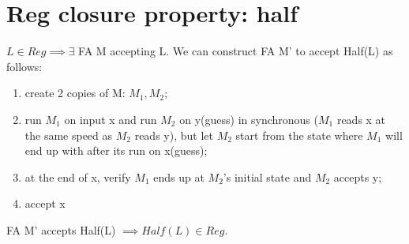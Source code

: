 \documentclass{article}
\begin{document}
\section{Reg closure property: half}
$L \in Reg \implies \exists$ FA M accepting L. We can construct FA M' to accept
Half(L) as follows:
\begin{enumerate}
  \item create 2 copies of M: $M_1, M_2$;
  \item run $M_1$ on input x and run $M_2$ on y(guess) in synchronous ($M_1$
  reads x at the same speed as $M_2$ reads y), but let $M_2$ start from the
  state where $M_1$ will end up with after its run on x(guess);
  \item at the end of x, verify $M_1$ ends up at $M_2$'s initial state and $M_2$
  accepts y;
  \item accept x
\end{enumerate}
FA M' accepts Half(L) $\implies Half(L) \in Reg$.
\end{document}
